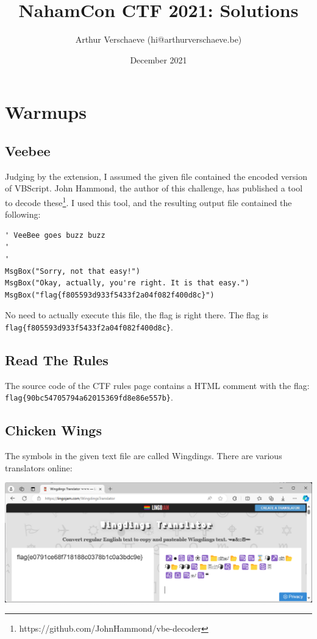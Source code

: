 \documentclass{article}
\title{NahamCon CTF 2021: Solutions} %
\author{Arthur Verschaeve (hi@arthurverschaeve.be)}
\date{December 2021}
\begin{document}
\maketitle

\section{Warmups}
\subsection{Veebee}

Judging by the extension, I assumed the given file contained the encoded version of VBScript. John Hammond, the author of this challenge, has published a tool to decode these\footnote{https://github.com/JohnHammond/vbe-decoder}. I used this tool, and the resulting output file contained the following:

\begin{lstlisting}              
' VeeBee goes buzz buzz
'
'
MsgBox("Sorry, not that easy!")
MsgBox("Okay, actually, you're right. It is that easy.")
MsgBox("flag{f805593d933f5433f2a04f082f400d8c}")
\end{lstlisting}

\noindent
No need to actually execute this file, the flag is right there. The flag is \texttt{flag\{f805593d933f5433f2a04f082f400d8c\}}.

\subsection{Read The Rules}

The source code of the CTF rules page contains a HTML comment with the flag: \newline\texttt{flag\{90bc54705794a62015369fd8e86e557b\}}.

\subsection{Chicken Wings}
The symbols in the given text file are called Wingdings. There are various translators online:

\begin{center}
    \includegraphics[width=16cm]{chicken-wings/screnshot.png}
\end{center}
\end{document}
